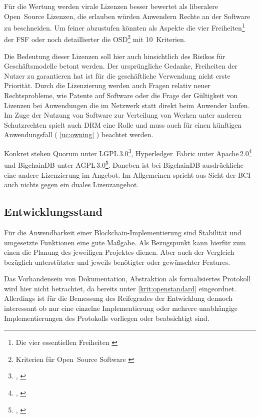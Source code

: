 Für die Wertung werden virale Lizenzen besser bewertet als liberalere Open~Source Lizenzen, die erlauben würden Anwendern Rechte an der Software zu beschneiden.
Um feiner abzustufen könnten als Aspekte die vier Freiheiten\footnote{Die vier essentiellen Freiheiten \autocite{w:fsf-freedoms}} der \gls{FSF}
oder noch detaillierter die \gls{OSD}\footnote{Kriterien für Open~Source Software \autocite{w:iso-osd}} mit 10~Kriterien.

Die Bedeutung dieser Lizenzen soll hier auch hinsichtlich des Risikos für Geschäftsmodelle betont werden.
Der ursprüngliche Gedanke, Freiheiten der Nutzer zu garantieren hat ist für die geschäftliche Verwendung nicht erste Priorität.
Durch die Lizenzierung werden auch Fragen relativ neuer Rechtsprobleme, wie Patente auf Software oder die Frage der Gültigkeit von Lizenzen bei Anwendungen die im Netzwerk statt direkt beim Anwender laufen.
Im Zuge der Nutzung von Software zur Verteilung von Werken unter anderen Schutzrechten spielt auch \gls{DRM} eine Rolle und muss auch für einen künftigen Anwendungsfall (\zB{} \ref{uc:owning} ) beachtet werden.

Konkret stehen Quorum unter LGPL\,3.0\footnote{\cite{w:license:lgpl3}, \cite{w:quorum-jpmorgan:github}}, Hyperledger~Fabric unter Apache\,2.0\footnote{\cite{w:license:al2}, \cite{w:hyperledger-fabric:github}} und BigchainDB unter AGPL\,3.0\footnote{\cite{w:license:agpl3}, \cite{w:bigchaindb:github}}. Daneben ist bei BigchainDB ausdrückliche eine andere Lizenzierung im Angebot. Im Allgemeinen spricht aus Sicht der \gls{BCI} auch nichts gegen ein duales Lizenzangebot.

\subsection{Entwicklungsstand}\label{krit:entwicklungsstand}

Für die Anwendbarkeit einer Blockchain-Implementierung sind Stabilität und umgesetzte Funktionen eine gute Maßgabe.
Als Bezugspunkt kann hierfür zum einen die Planung des jeweiligen Projektes dienen.
Aber auch der Vergleich bezüglich unterstützter und jeweils benötigter oder gewünschter Features.

Das Vorhandensein von Dokumentation, Abstraktion als formalisiertes Protokoll wird hier nicht betrachtet, da bereits unter
\ref{krit:openstandard} eingeordnet.
Allerdings ist für die Bemessung des Reifegrades der Entwicklung dennoch interessant ob nur eine einzelne Implementierung oder mehrere unabhängige Implementierungen des Protokolls vorliegen oder beabsichtigt sind.

